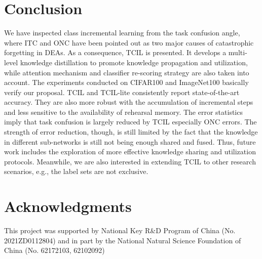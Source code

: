 \documentclass[letterpaper]{article} \usepackage{aaai23}  \usepackage{times}  \usepackage{helvet}  \usepackage{courier}  \usepackage[hyphens]{url}  \usepackage{graphicx} \urlstyle{rm} \def\UrlFont{\rm}  \usepackage{natbib}  \usepackage{caption} \frenchspacing  \setlength{\pdfpagewidth}{8.5in}  \setlength{\pdfpageheight}{11in}  \usepackage{algorithm}
\begin{document}
\section{Conclusion}
We have inspected class incremental learning from the task confusion angle, where ITC and ONC have been pointed out as two major causes of catastrophic forgetting in DEAs. As a consequence, TCIL is presented. It develops a multi-level knowledge distillation to promote knowledge propagation and utilization, while attention mechanism and classifier re-scoring strategy are also taken into account. The experiments conducted on CIFAR100 and ImageNet100 basically verify our proposal. TCIL and TCIL-lite consistently report state-of-the-art accuracy. They are also more robust with the accumulation of incremental steps and less sensitive to the availability of rehearsal memory. The error statistics imply that task confusion is largely reduced by TCIL especially ONC errors. The strength of error reduction, though, is still limited by the fact that the knowledge in different sub-networks is still not being enough shared and fused. Thus, future work includes the exploration of more effective knowledge sharing and utilization protocols. Meanwhile, we are also interested in extending TCIL to other research scenarios, e.g., the label sets are not exclusive.

\section{Acknowledgments}
This project was supported by National Key R\&D Program of China (No. 2021ZD0112804) and in part by the National Natural Science Foundation of China (No. 62172103,  62102092)


\end{document}

